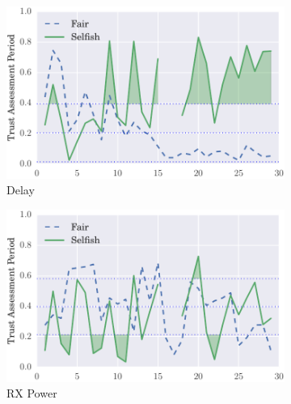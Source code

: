 \documentclass[runningheads,a4paper]{llncs}
\begin{document}
\begin{figure}
\begin{subfigure}{0.32\textwidth}
  \centering
  \includegraphics[width=.95\linewidth]{img/trust_bella_all_mobile_emph_ADelay_BadMouthingPowerControl.pdf}
  \caption{Delay}
  \label{fig:all_mobile_badmouthing_delay}
\end{subfigure}
\begin{subfigure}{0.32\textwidth}
\centering
  \includegraphics[width=.95\linewidth]{img/trust_bella_all_mobile_emph_ARXP_BadMouthingPowerControl.pdf}
  \caption{RX Power}
  \label{fig:all_mobile_badmouthing_rxp}
\end{subfigure}
\begin{subfigure}{0.32\textwidth}
\centering

\end{subfigure}
\end{figure}
\end{document}
